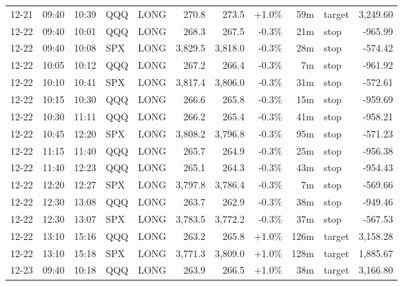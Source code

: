 \documentclass[11pt,a4paper,twoside]{article}
\begin{document}
\begin{center}
\begin{longtable}{>{\color{txtmain}}l l l l l r r r r >{\color{txtmain}}l r}
12-21 & 09:40 & 10:39 & QQQ & LONG & 270.8 & 273.5 & \textcolor{wingreen}{+1.0\%} & 59m & target & \textcolor{wingreen}{3,249.60} \\
12-22 & 09:40 & 10:01 & QQQ & LONG & 268.3 & 267.5 & \textcolor{lossred}{-0.3\%} & 21m & stop & \textcolor{lossred}{-965.99} \\
12-22 & 09:40 & 10:08 & SPX & LONG & 3,829.5 & 3,818.0 & \textcolor{lossred}{-0.3\%} & 28m & stop & \textcolor{lossred}{-574.42} \\
12-22 & 10:05 & 10:12 & QQQ & LONG & 267.2 & 266.4 & \textcolor{lossred}{-0.3\%} & 7m & stop & \textcolor{lossred}{-961.92} \\
12-22 & 10:10 & 10:41 & SPX & LONG & 3,817.4 & 3,806.0 & \textcolor{lossred}{-0.3\%} & 31m & stop & \textcolor{lossred}{-572.61} \\
12-22 & 10:15 & 10:30 & QQQ & LONG & 266.6 & 265.8 & \textcolor{lossred}{-0.3\%} & 15m & stop & \textcolor{lossred}{-959.69} \\
12-22 & 10:30 & 11:11 & QQQ & LONG & 266.2 & 265.4 & \textcolor{lossred}{-0.3\%} & 41m & stop & \textcolor{lossred}{-958.21} \\
12-22 & 10:45 & 12:20 & SPX & LONG & 3,808.2 & 3,796.8 & \textcolor{lossred}{-0.3\%} & 95m & stop & \textcolor{lossred}{-571.23} \\
12-22 & 11:15 & 11:40 & QQQ & LONG & 265.7 & 264.9 & \textcolor{lossred}{-0.3\%} & 25m & stop & \textcolor{lossred}{-956.38} \\
12-22 & 11:40 & 12:23 & QQQ & LONG & 265.1 & 264.3 & \textcolor{lossred}{-0.3\%} & 43m & stop & \textcolor{lossred}{-954.43} \\
12-22 & 12:20 & 12:27 & SPX & LONG & 3,797.8 & 3,786.4 & \textcolor{lossred}{-0.3\%} & 7m & stop & \textcolor{lossred}{-569.66} \\
12-22 & 12:30 & 13:08 & QQQ & LONG & 263.7 & 262.9 & \textcolor{lossred}{-0.3\%} & 38m & stop & \textcolor{lossred}{-949.46} \\
12-22 & 12:30 & 13:07 & SPX & LONG & 3,783.5 & 3,772.2 & \textcolor{lossred}{-0.3\%} & 37m & stop & \textcolor{lossred}{-567.53} \\
12-22 & 13:10 & 15:16 & QQQ & LONG & 263.2 & 265.8 & \textcolor{wingreen}{+1.0\%} & 126m & target & \textcolor{wingreen}{3,158.28} \\
12-22 & 13:10 & 15:18 & SPX & LONG & 3,771.3 & 3,809.0 & \textcolor{wingreen}{+1.0\%} & 128m & target & \textcolor{wingreen}{1,885.67} \\
12-23 & 09:40 & 10:18 & QQQ & LONG & 263.9 & 266.5 & \textcolor{wingreen}{+1.0\%} & 38m & target & \textcolor{wingreen}{3,166.80} \\

\end{longtable}
\end{center}
\end{document}
